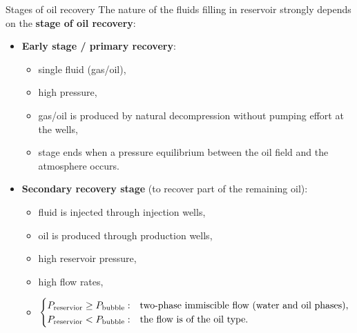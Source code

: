 %
\begin{frame}{Stages of oil recovery}
	The nature of the fluids filling in reservoir strongly depends on the \alert{\bf stage of oil recovery}:
	\begin{itemize}
		\item {\bf Early stage / primary recovery}: 
		\begin{itemize}
			\item single fluid (gas/oil), 
			\item high pressure,
			\item gas/oil is produced by natural decompression without 
			pumping effort at the wells, 
			\item stage ends when a pressure equilibrium between the oil field and the atmosphere occurs.
		\end{itemize}
		\item {\bf Secondary recovery stage} (to recover part of the remaining oil): 
		\begin{itemize}
			\item fluid is injected through injection wells,
			\item oil is produced through production wells,
			\item high reservoir pressure,
			\item high flow rates,
			\item 
			$
			\begin{cases}
			P_{\rm reservior} \geq P_{\rm bubble}: & 
			\text{two-phase immiscible flow (water and oil phases),} \\
			P_{\rm reservior} < P_{\rm bubble}: & 	
			\text{the flow is of the oil type.} \\
			\end{cases}
			$			
		\end{itemize}
	\end{itemize}
\end{frame}
%
